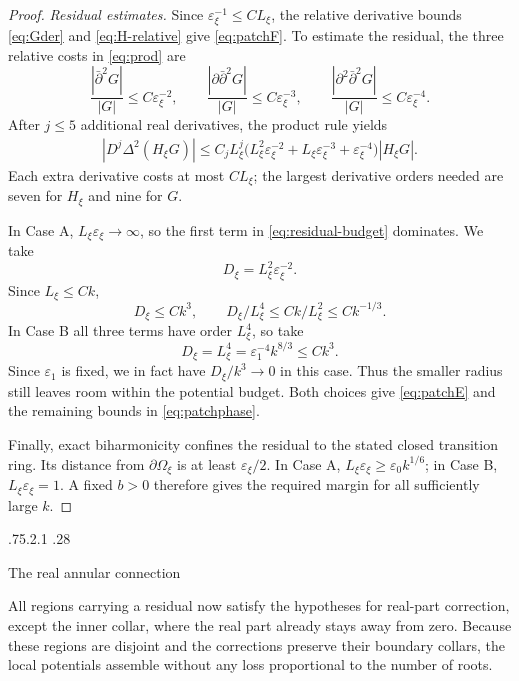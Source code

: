 \documentclass[11pt,a4paper,leqno]{amsart}
\makeatletter
\numberwithin{equation}{section}
\theoremstyle{landisplain}
\theoremstyle{landisdefinition}
\theoremstyle{landisremark}
\newcommand{\pa}{\partial}
\newcommand{\pb}{\bar\partial}
\newcommand{\eps}{\varepsilon}
\renewcommand\subsection{\@startsection{subsection}{2}{\z@}%
  {.75\baselineskip \@plus .2\baselineskip \@minus .1\baselineskip}%
  {.28\baselineskip}%
  {\normalfont\bfseries\raggedright}}
\makeatother
\begin{document}
\begin{proof}
\smallskip\noindent\emph{Residual estimates.}
Since $\eps_\xi^{-1}\le CL_\xi$, the relative derivative
bounds \eqref{eq:Gder} and \eqref{eq:H-relative} give
\eqref{eq:patchF}. To estimate the residual, the three relative
costs in \eqref{eq:prod} are
\[
 \frac{|\pb^2G|}{|G|}\le C\eps_\xi^{-2},\qquad
 \frac{|\pa\pb^2G|}{|G|}\le C\eps_\xi^{-3},\qquad
 \frac{|\pa^2\pb^2G|}{|G|}\le C\eps_\xi^{-4}.
\]
After $j\le5$ additional real derivatives, the product rule yields
\begin{equation}\label{eq:residual-budget}
 \begin{split}
 |D^j\Delta^2(H_\xi G)|
 \le C_j L_\xi^j\bigl(L_\xi^2\eps_\xi^{-2}
                +L_\xi\eps_\xi^{-3}+\eps_\xi^{-4}\bigr)|H_\xi G|.
 \end{split}
\end{equation}
Each extra derivative costs at most $CL_\xi$; the largest derivative
orders needed are seven for $H_\xi$ and nine for $G$.

In Case A, $L_\xi\eps_\xi\to\infty$, so the first term
in \eqref{eq:residual-budget} dominates. We take
\begin{equation}\label{eq:budget-A}
 D_\xi=L_\xi^2\eps_\xi^{-2}.
\end{equation}
Since $L_\xi\le Ck$,
\[
 D_\xi\le Ck^3,\qquad
 D_\xi/L_\xi^4\le Ck/L_\xi^2\le Ck^{-1/3}.
\]
In Case B all three terms have order $L_\xi^4$, so take
\begin{equation}\label{eq:budget-B}
 D_\xi=L_\xi^4=\eps_1^{-4}k^{8/3}\le Ck^3.
\end{equation}
Since $\eps_1$ is fixed, we in fact have $D_\xi/k^3\to0$
in this case. Thus the smaller radius still leaves room within
the potential budget. Both choices give \eqref{eq:patchE} and
the remaining bounds in \eqref{eq:patchphase}.

Finally, exact biharmonicity confines the residual to the stated
closed transition ring. Its distance from $\pa\Omega_\xi$ is at least
$\eps_\xi/2$. In Case A,
$L_\xi\eps_\xi\ge\eps_0k^{1/6}$; in Case B,
$L_\xi\eps_\xi=1$. A fixed $b>0$ therefore gives the required
margin for all sufficiently large $k$.
\end{proof}

\subsection{The real annular connection}
\label{sec:annular}

All regions carrying a residual now satisfy the hypotheses for
real-part correction, except the inner collar, where the real part
already stays away from zero. Because these regions are disjoint
and the corrections preserve their boundary collars, the local
potentials assemble without any loss proportional to the number
of roots.
\end{document}
